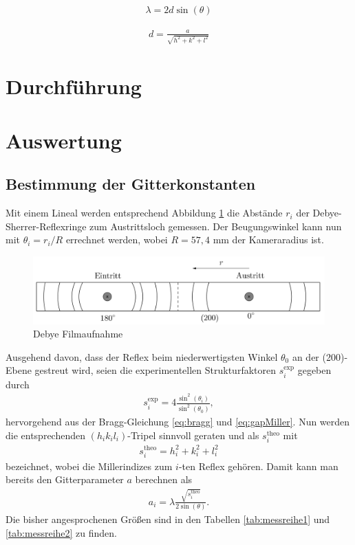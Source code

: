 \begin{align}
 \lambda = 2 d \sin(\theta)
 \label{eq:bragg}
\end{align}

\begin{align}
 d = \frac{a}{\sqrt{h^2 + k^2 + l^2}}
 \label{eq:gapMiller}
\end{align}




\section{Durchführung}


\section{Auswertung}
\subsection{Bestimmung der Gitterkonstanten}

Mit einem Lineal werden entsprechend Abbildung \ref{pic:debyefilm} die Abstände $r_i$ der Debye-Sherrer-Reflexringe zum Austrittsloch gemessen. Der 
Beugungswinkel kann nun mit $\theta_i = r_i/R$ errechnet werden, wobei $R=57,4$ mm der Kameraradius ist. 
\begin{figure}[H]
 \includegraphics[width=\textwidth]{../pics/debyestreifen.jpg}
 \caption{Debye Filmaufnahme}
 \label{pic:debyefilm}
\end{figure}
\noindent Ausgehend davon, dass der Reflex beim niederwertigsten
Winkel $\theta_0$ an der (200)-Ebene gestreut wird, seien die experimentellen Strukturfaktoren $s^\text{exp}_i$ gegeben durch
\begin{align}
 s^\text{exp}_i = 4\frac{\sin^2(\theta_i)}{\sin^2(\theta_0)},
 \label{eq:structExp}
\end{align}
hervorgehend aus der Bragg-Gleichung \eqref{eq:bragg} und \eqref{eq:gapMiller}. Nun werden die entsprechenden $(h_ik_il_i)$-Tripel sinnvoll geraten und als 
$s^\text{theo}_i$ mit
\begin{align}
 s^\text{theo}_i = h_i^2 + k_i^2 + l_i^2
 \label{eq:structTheo}
\end{align}
bezeichnet, wobei die Millerindizes zum $i$-ten Reflex gehören. Damit kann man bereits den Gitterparameter $a$ berechnen als
\begin{align}
 a_i = \lambda\frac{\sqrt{s^\text{theo}_i}}{2\sin(\theta)}.
 \label{eq:gitterparameter}
\end{align}
Die bisher angesprochenen Größen sind in den Tabellen \ref{tab:messreihe1} und \ref{tab:messreihe2} zu finden.

